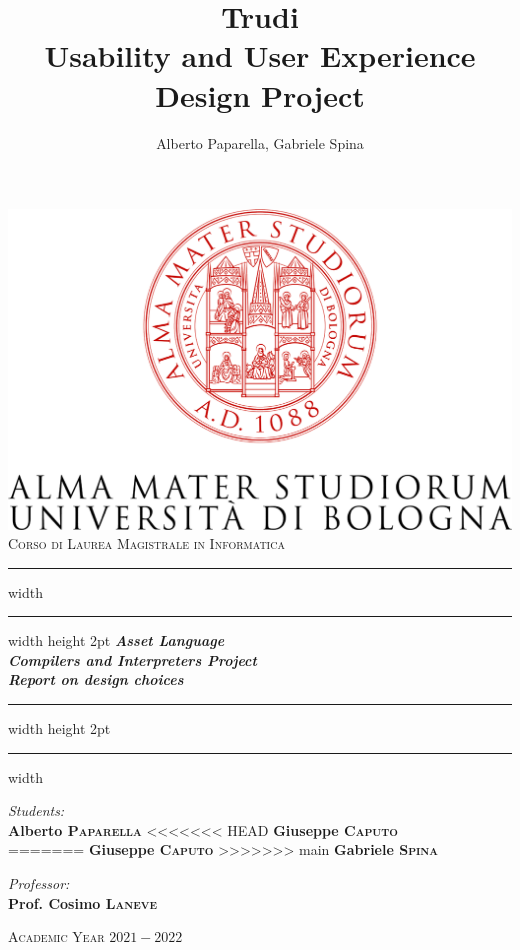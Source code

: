 \documentclass[11pt]{article} %
\title{Trudi\\[1ex] \large Usability and User Experience Design Project}
\author{Alberto Paparella, Gabriele Spina}
\date{} %
\begin{document}

\begin{titlepage}
	\centering
	\includegraphics[width=\textwidth]{logo.png}\\
	\vspace*{1cm}
	\Large \textsc{Corso di Laurea Magistrale in Informatica}
	
	\vspace*{10mm}
	\hrule width \hsize \kern 1mm \hrule width \hsize height 2pt
	\vspace*{5mm}
	\Huge \emph{\textbf{Asset Language}}\\
	\large \emph{\textbf{Compilers and Interpreters Project}}\\
	\large \emph{\textbf{Report on design choices}}
	\vspace*{5mm}
	\hrule width \hsize height 2pt
	\vspace*{1mm}
	\hrule width \hsize \kern 1mm
	
	\vspace*{10mm}
	\begin{minipage}{0.45\textwidth}
		\begin{flushleft} \Large
			\emph{Students:}\\
			\Large \textbf{Alberto \textsc{Paparella}}
<<<<<<< HEAD
			\Large \textbf{Giuseppe \textsc{Caputo}}\\
=======
			\Large \textbf{Giuseppe \textsc{Caputo}}
>>>>>>> main
			\Large \textbf{Gabriele \textsc{Spina}}
		\end{flushleft}
	\end{minipage}	
	\begin{minipage}{0.45\textwidth}
		\begin{flushright} \Large
			\emph{Professor:}\\
			\Large \textbf{Prof. Cosimo \textsc{Laneve}}
		\end{flushright}
	\end{minipage}
	
	\vspace*{15mm}
	\Large \textsc{Academic Year $2021-2022$}
\end{titlepage}
\end{document}
